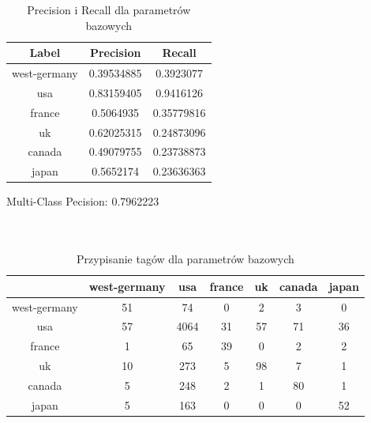 \documentclass{classrep}
\begin{document}
\begin{table}[H]
\begin{tabular}{|c|c|c|}
\hline
Label        & Precision  & Recall     \\ \hline
west-germany & 0.39534885 & 0.3923077  \\ \hline
usa          & 0.83159405 & 0.9416126  \\ \hline
france       & 0.5064935  & 0.35779816 \\ \hline
uk           & 0.62025315 & 0.24873096 \\ \hline
canada       & 0.49079755 & 0.23738873 \\ \hline
japan        & 0.5652174  & 0.23636363 \\ \hline
\end{tabular}
\caption{Precision i Recall dla parametrów bazowych}
\end{table}
Multi-Class Pecision: 0.7962223\\
\\
\\
\begin{table}[H]
\begin{tabular}{|c|c|c|c|c|c|c|}
\hline
             & west-germany & usa  & france & uk & canada & japan \\ \hline
west-germany & 51           & 74   & 0      & 2  & 3      & 0     \\ \hline
usa          & 57           & 4064 & 31     & 57 & 71     & 36    \\ \hline
france       & 1            & 65   & 39     & 0  & 2      & 2     \\ \hline
uk           & 10           & 273  & 5      & 98 & 7      & 1     \\ \hline
canada       & 5            & 248  & 2      & 1  & 80     & 1     \\ \hline
japan        & 5            & 163  & 0      & 0  & 0      & 52    \\ \hline
\end{tabular}
\caption{Przypisanie tagów dla parametrów bazowych}
\end{table}
\newpage
\end{document}
